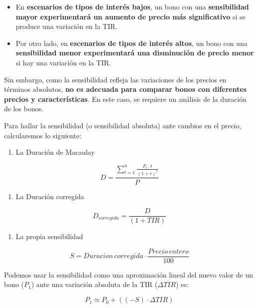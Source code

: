 \documentclass[
  letterpaper,
  DIV=11,
  numbers=noendperiod]{scrartcl}
\providecommand{\tightlist}{%
  \setlength{\itemsep}{0pt}\setlength{\parskip}{0pt}}\usepackage{longtable,booktabs,array}
\begin{document}
\begin{itemize}
\item
  En \textbf{escenarios de tipos de interés bajos}, un bono con una
  \textbf{sensibilidad mayor experimentará un aumento de precio más
  significativo} si se produce una variación en la TIR.
\item
  Por otro lado, en \textbf{escenarios de tipos de interés altos}, un
  bono con una \textbf{sensibilidad menor experimentará una disminución
  de precio menor} si hay una variación en la TIR.
\end{itemize}

Sin embargo, como la sensibilidad refleja las variaciones de los precios
en términos absolutos, \textbf{no es adecuada para comparar bonos con
diferentes precios y características}. En este caso, se requiere un
análisis de la duración de los bonos.

Para hallar la sensibilidad (o sensibilidad absoluta) ante cambios en el
precio, calcularemos lo siguiente:

\begin{tcolorbox}[enhanced jigsaw, colframe=quarto-callout-note-color-frame, opacityback=0, colback=white, leftrule=.75mm, left=2mm, breakable, arc=.35mm, rightrule=.15mm, toprule=.15mm, bottomrule=.15mm]
\begin{minipage}[t]{5.5mm}
\textcolor{quarto-callout-note-color}{\faInfo}
\end{minipage}%
\begin{minipage}[t]{\textwidth - 5.5mm}

\begin{enumerate}
\def\labelenumi{\arabic{enumi}.}
\tightlist
\item
  La Duración de Macaulay
\end{enumerate}

\[D=\frac{\sum_{t=1}^{n}\frac{F_t\cdot t}{\left(1+r\right)^t}}{P}\]

\begin{enumerate}
\def\labelenumi{\arabic{enumi}.}
\setcounter{enumi}{1}
\tightlist
\item
  La Duración corregida
\end{enumerate}

\[D_{corregida}=\frac{D}{\left(1+TIR\right)} \]

\begin{enumerate}
\def\labelenumi{\arabic{enumi}.}
\setcounter{enumi}{2}
\tightlist
\item
  La propia sensibilidad
\end{enumerate}

\[S= Duracion\,corregida \cdot \frac{Precio\,entero}{100}\]

Podemos usar la sensibilidad como una aproximación lineal del nuevo
valor de un bono (\(P_1\)) ante una variación absoluta de la TIR
(\(\Delta TIR\)) es:

\[P_1\simeq P_0 + ((-S)\cdot\Delta TIR)\]

\end{minipage}%
\end{tcolorbox}
\end{document}

